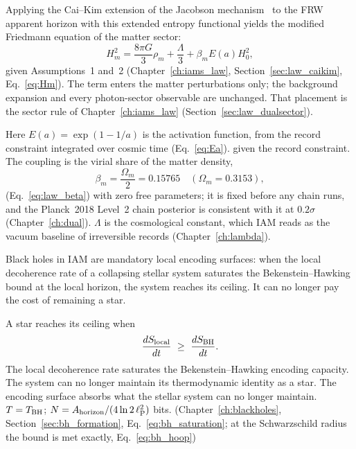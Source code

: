 Applying the Cai--Kim extension of the Jacobson mechanism~\cite{CaiKim2005} to the FRW apparent horizon with this extended entropy functional
yields the modified Friedmann equation of the matter sector:
\begin{equation}
H_m^2=\frac{8\pi G}{3}\rho_m+\frac\Lambda3+\beta_mE(a)H_0^2 , \label{eq:sat_Hm}
\end{equation}
\derived{} given Assumptions~1 and~2 (Chapter~\ref{ch:iams_law}, Section~\ref{sec:law_caikim}, Eq.~\eqref{eq:Hm}). The term enters the
matter perturbations only; the background expansion and every photon-sector observable are unchanged. That placement is the sector rule
of Chapter~\ref{ch:iams_law} (Section~\ref{sec:law_dualsector}). \conjecture

Here $E(a)=\exp(1-1/a)$ is the activation function, from the record constraint integrated over cosmic time (Eq.~\eqref{eq:Ea}).
\derived{} given the record constraint. The coupling is the virial share of the matter density,
\begin{equation}
\beta_m=\frac{\Omega_m}{2}=0.15765\quad(\Omega_m=0.3153), \label{eq:sat_beta}
\end{equation}
\prediction{} (Eq.~\eqref{eq:law_beta}) with zero free parameters; it is fixed before any chain runs, and the Planck~2018 Level~2 chain
posterior is consistent with it at $0.2\sigma$ (Chapter~\ref{ch:dual}). \measured{} $\Lambda$ is the cosmological constant, which IAM reads as
the vacuum baseline of irreversible records (Chapter~\ref{ch:lambda}). \conjecture

Black holes in IAM are mandatory local encoding surfaces: when the local decoherence rate of a collapsing stellar system saturates the
Bekenstein--Hawking bound at the local horizon, the system reaches its ceiling. It can no longer pay the cost of remaining a star.

\begin{keybox}[title=Black hole: the saturation condition (stellar scale)]
A star reaches its ceiling when
\begin{equation}
\frac{dS_{\rm local}}{dt}\ \ge\ \frac{dS_{\rm BH}}{dt}. \label{eq:sat_star}
\end{equation}
The local decoherence rate saturates the Bekenstein--Hawking encoding capacity. The system can no longer maintain its thermodynamic identity as
a star. The encoding surface absorbs what the stellar system can no longer maintain. $T=T_{\rm BH}$; $N=A_{\rm horizon}/(4\ln2\,\ell_{\mathrm P}^2)$ bits.
\conjecture{} (Chapter~\ref{ch:blackholes}, Section~\ref{sec:bh_formation}, Eq.~\eqref{eq:bh_saturation}; at the Schwarzschild radius the
bound is met exactly, Eq.~\eqref{eq:bh_hoop})
\end{keybox}

